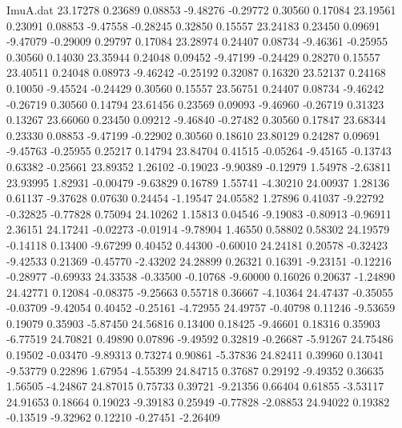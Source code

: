 \begin{filecontents}{ImuA.dat}
  23.17278    0.23689    0.08853   -9.48276   -0.29772    0.30560    0.17084
  23.19561    0.23091    0.08853   -9.47558   -0.28245    0.32850    0.15557
  23.24183    0.23450    0.09691   -9.47079   -0.29009    0.29797    0.17084
  23.28974    0.24407    0.08734   -9.46361   -0.25955    0.30560    0.14030
  23.35944    0.24048    0.09452   -9.47199   -0.24429    0.28270    0.15557
  23.40511    0.24048    0.08973   -9.46242   -0.25192    0.32087    0.16320
  23.52137    0.24168    0.10050   -9.45524   -0.24429    0.30560    0.15557
  23.56751    0.24407    0.08734   -9.46242   -0.26719    0.30560    0.14794
  23.61456    0.23569    0.09093   -9.46960   -0.26719    0.31323    0.13267
  23.66060    0.23450    0.09212   -9.46840   -0.27482    0.30560    0.17847
  23.68344    0.23330    0.08853   -9.47199   -0.22902    0.30560    0.18610
  23.80129    0.24287    0.09691   -9.45763   -0.25955    0.25217    0.14794
  23.84704    0.41515   -0.05264   -9.45165   -0.13743    0.63382   -0.25661
  23.89352    1.26102   -0.19023   -9.90389   -0.12979    1.54978   -2.63811
  23.93995    1.82931   -0.00479   -9.63829    0.16789    1.55741   -4.30210
  24.00937    1.28136    0.61137   -9.37628    0.07630    0.24454   -1.19547
  24.05582    1.27896    0.41037   -9.22792   -0.32825   -0.77828    0.75094
  24.10262    1.15813    0.04546   -9.19083   -0.80913   -0.96911    2.36151
  24.17241   -0.02273   -0.01914   -9.78904    1.46550    0.58802    0.58302
  24.19579   -0.14118    0.13400   -9.67299    0.40452    0.44300   -0.60010
  24.24181    0.20578   -0.32423   -9.42533    0.21369   -0.45770   -2.43202
  24.28899    0.26321    0.16391   -9.23151   -0.12216   -0.28977   -0.69933
  24.33538   -0.33500   -0.10768   -9.60000    0.16026    0.20637   -1.24890
  24.42771    0.12084   -0.08375   -9.25663    0.55718    0.36667   -4.10364
  24.47437   -0.35055   -0.03709   -9.42054    0.40452   -0.25161   -4.72955
  24.49757   -0.40798    0.11246   -9.53659    0.19079    0.35903   -5.87450
  24.56816    0.13400    0.18425   -9.46601    0.18316    0.35903   -6.77519
  24.70821    0.49890    0.07896   -9.49592    0.32819   -0.26687   -5.91267
  24.75486    0.19502   -0.03470   -9.89313    0.73274    0.90861   -5.37836
  24.82411    0.39960    0.13041   -9.53779    0.22896    1.67954   -4.55399
  24.84715    0.37687    0.29192   -9.49352    0.36635    1.56505   -4.24867
  24.87015    0.75733    0.39721   -9.21356    0.66404    0.61855   -3.53117
  24.91653    0.18664    0.19023   -9.39183    0.25949   -0.77828   -2.08853
  24.94022    0.19382   -0.13519   -9.32962    0.12210   -0.27451   -2.26409

\end{filecontents}
